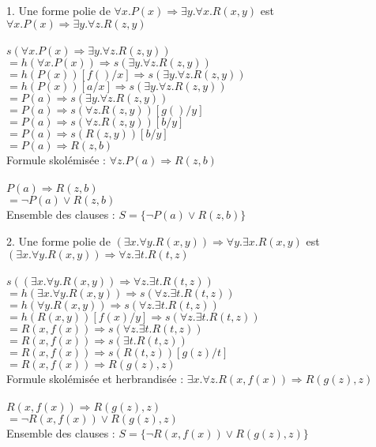 \documentclass[11pt,letterpaper]{article}
\newcommand\tab[1][12pt]{\hspace*{#1}}
\begin{document}
1.  Une forme polie de $\forall x.P(x)\Rightarrow \exists y.\forall x.R(x,y)$ est $\forall x.P(x)\Rightarrow \exists y.\forall z.R(z,y)$\\\tab
\\\tab
$s(\forall x.P(x)\Rightarrow \exists y.\forall z.R(z,y))$\\\tab
$= h(\forall x.P(x))\Rightarrow s(\exists y.\forall z.R(z,y))$\\\tab
$= h(P(x))[f()/x]\Rightarrow s(\exists y.\forall z.R(z,y))$\\\tab
$= h(P(x))[a/x]\Rightarrow s(\exists y.\forall z.R(z,y))$\\\tab
$= P(a)\Rightarrow s(\exists y.\forall z.R(z,y))$\\\tab
$= P(a)\Rightarrow s(\forall z.R(z,y))[g()/y]$\\\tab
$= P(a)\Rightarrow s(\forall z.R(z,y))[b/y]$\\\tab
$= P(a)\Rightarrow s(R(z,y))[b/y]$\\\tab
$= P(a)\Rightarrow R(z,b)$\\\tab
Formule skolémisée : $\forall z.P(a)\Rightarrow R(z,b)$\\\tab
\\\tab
$P(a)\Rightarrow R(z,b)$\\\tab
$= \neg P(a)\lor R(z,b)$\\\tab
Ensemble des clauses : $S = \{\neg P(a)\lor R(z,b)\}$\\

\newpage

2.  Une forme polie de $(\exists x.\forall y.R(x,y)) \Rightarrow \forall y.\exists x.R(x,y)$ est $(\exists x.\forall y.R(x,y)) \Rightarrow \forall z.\exists t.R(t,z)$\\\tab
\\\tab
$s((\exists x.\forall y.R(x,y)) \Rightarrow \forall z.\exists t.R(t,z))$\\\tab
$= h(\exists x.\forall y.R(x,y)) \Rightarrow s(\forall z.\exists t.R(t,z))$\\\tab
$= h(\forall y.R(x,y)) \Rightarrow s(\forall z.\exists t.R(t,z))$\\\tab
$= h(R(x,y))[f(x)/y] \Rightarrow s(\forall z.\exists t.R(t,z))$\\\tab
$= R(x,f(x)) \Rightarrow s(\forall z.\exists t.R(t,z))$\\\tab
$= R(x,f(x)) \Rightarrow s(\exists t.R(t,z))$\\\tab
$= R(x,f(x)) \Rightarrow s(R(t,z))[g(z)/t]$\\\tab
$= R(x,f(x)) \Rightarrow R(g(z),z)$\\\tab
Formule skolémisée et herbrandisée : $\exists x.\forall z.R(x,f(x)) \Rightarrow R(g(z),z)$\\\tab
\\\tab
$R(x,f(x)) \Rightarrow R(g(z),z)$\\\tab
$= \neg R(x,f(x))\lor R(g(z),z)$\\\tab
Ensemble des clauses : $S = \{\neg R(x,f(x))\lor R(g(z),z)\}$\\
\end{document}
